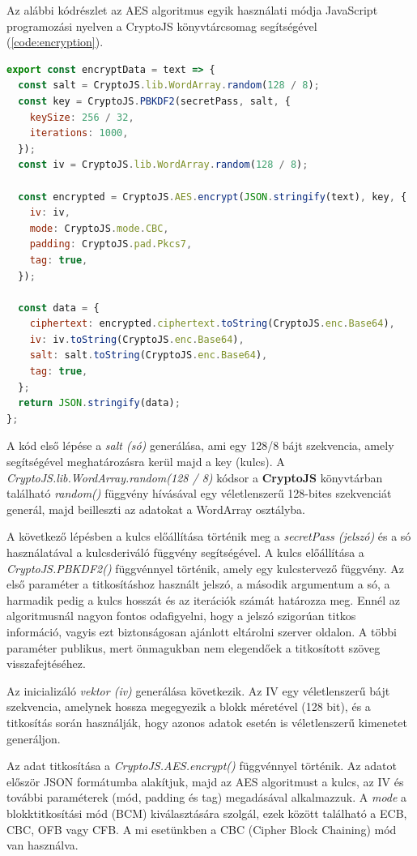 Az alábbi kódrészlet az AES algoritmus egyik használati módja JavaScript programozási nyelven a CryptoJS könyvtárcsomag segítségével (\ref{code:encryption}).

\begin{lstlisting}[caption={Titkosítás példakód.}, captionpos=b, language = JavaScript, label={code:encryption}]
export const encryptData = text => {
  const salt = CryptoJS.lib.WordArray.random(128 / 8);
  const key = CryptoJS.PBKDF2(secretPass, salt, {
    keySize: 256 / 32,
    iterations: 1000,
  });
  const iv = CryptoJS.lib.WordArray.random(128 / 8);

  const encrypted = CryptoJS.AES.encrypt(JSON.stringify(text), key, {
    iv: iv,
    mode: CryptoJS.mode.CBC,
    padding: CryptoJS.pad.Pkcs7,
    tag: true,
  });

  const data = {
    ciphertext: encrypted.ciphertext.toString(CryptoJS.enc.Base64),
    iv: iv.toString(CryptoJS.enc.Base64),
    salt: salt.toString(CryptoJS.enc.Base64),
    tag: true,
  };
  return JSON.stringify(data);
};
\end{lstlisting}

A kód első lépése a \textit{salt (só)} generálása, ami egy 128/8 bájt szekvencia, amely segítségével meghatározásra kerül majd a key (kulcs). A \textit{CryptoJS.lib.WordArray.random(128 / 8)} kódsor a \textbf{CryptoJS} könyvtárban található \textit{random()} függvény hívásával egy véletlenszerű 128-bites szekvenciát generál, majd beilleszti az adatokat a WordArray osztályba.

A következő lépésben a kulcs előállítása történik meg a \textit{secretPass (jelszó)} és a só használatával a kulcsderiváló függvény segítségével. A kulcs előállítása a \textit{CryptoJS.PBKDF2()} függvénnyel történik, amely egy kulcstervező függvény. Az első paraméter a titkosításhoz használt jelszó, a második argumentum a só, a harmadik pedig a kulcs hosszát és az iterációk számát határozza meg. Ennél az algoritmusnál nagyon fontos odafigyelni, hogy a jelszó szigorúan titkos információ, vagyis ezt biztonságosan ajánlott eltárolni szerver oldalon. A többi paraméter publikus, mert önmagukban nem elegendőek a titkosított szöveg visszafejtéséhez.

Az inicializáló \textit{vektor (iv)} generálása következik. Az IV egy véletlenszerű bájt szekvencia, amelynek hossza megegyezik a blokk méretével (128 bit), és a titkosítás során használják, hogy azonos adatok esetén is véletlenszerű kimenetet generáljon.

Az adat titkosítása a \textit{CryptoJS.AES.encrypt()} függvénnyel történik. Az adatot először JSON formátumba alakítjuk, majd az AES algoritmust a kulcs, az IV és további paraméterek (mód, padding és tag) megadásával alkalmazzuk. A \textit{mode} a blokktitkosítási mód (BCM) kiválasztására szolgál, ezek között található a ECB, CBC, OFB vagy CFB. A mi esetünkben a CBC (Cipher Block Chaining) mód van használva.


